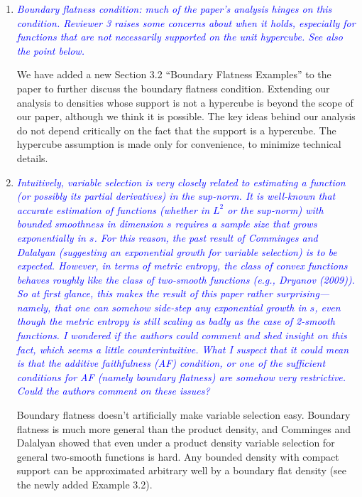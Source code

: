 \documentclass[pdftex,12pt]{article}
\def\rc#1{{\it\textcolor{blue}{#1}}\smallskip}
\begin{document}
\begin{enumerate}
\item \rc{Boundary flatness condition: much of the paper's analysis hinges on
this condition.  Reviewer 3 raises some concerns about when it holds,
especially for functions that are not necessarily supported on the
unit hypercube.  See also the point below.}

We have added a new Section 3.2 ``Boundary Flatness Examples'' to the
paper to further discuss the boundary flatness condition.
Extending our analysis to densities whose support
is not a hypercube is beyond the scope of our paper, although we think it
is possible. The key ideas behind our analysis do not depend critically
on the fact that the support is a hypercube. The hypercube assumption
is made only for convenience, to minimize technical details.

\item \rc{Intuitively, variable selection is very closely related to
estimating a function (or possibly its partial derivatives) in the
sup-norm.  It is well-known that accurate estimation of functions
(whether in $L^2$ or the sup-norm) with bounded smoothness in dimension
$s$ requires a sample size that grows exponentially in $s$.  For this
reason, the past result of Comminges and Dalalyan (suggesting an
exponential growth for variable selection) is to be expected.
However, in terms of metric entropy, the class of convex functions
behaves roughly like the class of two-smooth functions (e.g., Dryanov
(2009)).  So at first glance, this makes the result of this paper
rather surprising---namely, that one can somehow side-step any
exponential growth in $s$, even though the metric entropy is still
scaling as badly as the case of 2-smooth functions.  I wondered if the
authors could comment and shed insight on this fact, which seems a
little counterintuitive.  What I suspect that it could mean is that
the additive faithfulness (AF) condition, or one of the sufficient
conditions for AF (namely boundary flatness) are somehow very
restrictive.  Could the authors comment on these issues?}

Boundary flatness doesn't artificially make variable selection
easy. Boundary flatness is much more general than the product density,
and Comminges and Dalalyan showed that even under a product density
variable selection for general two-smooth functions is hard. Any
bounded density with compact support can be approximated arbitrary
well by a boundary flat density (see the newly added Example 3.2).


\end{enumerate}
\end{document}

